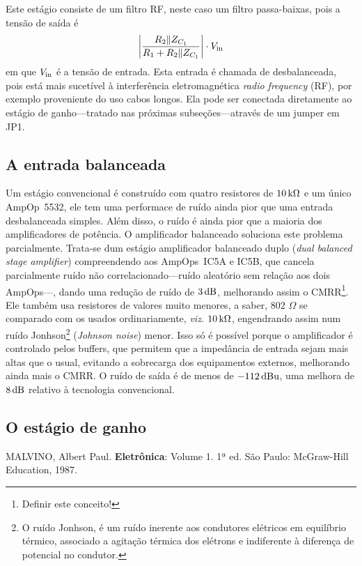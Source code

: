 \documentclass[12pt, a4paper, leqno, twoside]{book}
\def\ohm{\,\Omega}
\def\ampop{AmpOp}
\def\db{{\rm dB}}
\begin{document}
  Este est\'agio consiste de um filtro RF, neste caso um filtro passa-baixas, pois a tens\~ao de sa\'ida \'e 
  \begin{equation}
    \bigg|{R_2\|Z_{C_1}\over R_1+R_2\|Z_{C_1}}\bigg|\cdot V_{\rm in}
  \end{equation}
  em que $V_{\rm in}$ \'e a tens\~ao de entrada. Esta entrada \'e chamada de desbalanceada, pois est\'a mais sucet\'ivel \`a interfer\^encia eletromagn\'etica {\it radio frequency} (RF), por exemplo proveniente do uso cabos longos. Ela pode ser conectada diretamente ao est\'agio de ganho---tratado nas pr\'oximas subse\c c\~oes---atrav\'es de um jumper em JP1. 

  \subsection{A entrada balanceada}
  Um est\'agio convencional \'e constru\'ido com quatro resistores de $10\,{\rm k}\Omega$ e um \'unico \ampop\ 5532, ele tem uma performace de ru\'ido ainda pior que uma entrada desbalanceada simples. Al\'em disso, o ru\'ido \'e ainda pior que a maioria dos amplificadores de pot\^encia. O amplificador balanceado soluciona este problema parcialmente. Trata-se dum est\'agio amplificador balanceado duplo ({\it dual balanced stage amplifier}) compreendendo aos \ampop{s}\ IC5A e IC5B, que cancela parcialmente ru\'ido n\~ao correlacionado---ru\'ido aleat\'orio sem rela\c c\~ao aos dois \ampop{s}---, dando uma redu\c c\~ao de ru\'ido de $3\,\db$, melhorando assim o CMRR\footnote{Definir este conceito!}. Ele tamb\'em usa resistores de valores muito menores, a saber, $802\,\ohm$ se comparado com os usados ordinariamente, {\it viz.} $10\,{\rm k}\Omega$, engendrando assim num ru\'ido Jonhson\footnote{O ru\'ido Jonhson, \'e um ru\'ido inerente aos condutores el\'etricos em equil\'ibrio t\'ermico, associado a agita\c c\~ao t\'ermica dos el\'etrons e indiferente \`a diferen\c ca de potencial no condutor.} ({\it Johnson noise}) menor. Isso s\'o \'e poss\'ivel porque o amplificador \'e controlado pelos buffers, que permitem que a imped\^ancia de entrada sejam mais altas que o usual, evitando a sobrecarga dos equipamentos externos, melhorando ainda mais o CMRR. O ru\'ido de sa\'ida \'e de menos de $-112\,\db{\rm u}$, uma melhora de $8\,\db$ relativo \`a tecnologia convencional.
  \subsection{O est\'agio de ganho}

  \begin{thebibliography}{}
    MALVINO, Albert Paul. {\bf Eletr\^onica\/}: Volume 1. 1ª ed. S\~ao Paulo: McGraw-Hill Education, 1987.
  \end{thebibliography}
\end{document}
